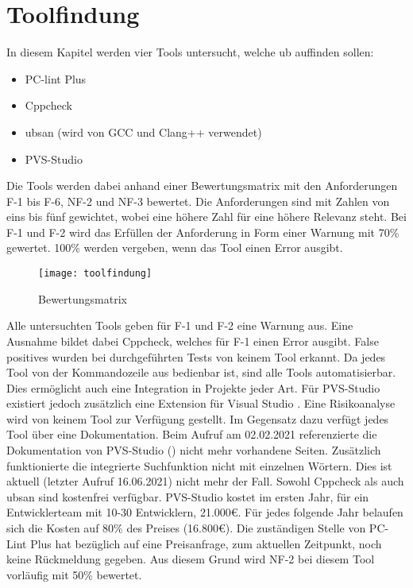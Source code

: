 \chapter{Toolfindung}
\label{ch:toolfindung}

In diesem Kapitel werden vier Tools untersucht, welche \gls{ub} auffinden sollen:
\begin{itemize}
    \item PC-lint Plus \cite{misc:pclintplus}
    \item Cppcheck \cite{misc:cppcheck}
    \item \gls{ubsan} (wird von GCC und Clang++ verwendet) \cite{misc:ubsan}
    \item PVS-Studio \cite{misc:pvsstudio}
\end{itemize}
Die Tools werden dabei anhand einer Bewertungsmatrix mit den Anforderungen F-1 bis F-6, NF-2 und NF-3 bewertet. Die Anforderungen sind mit Zahlen von eins bis fünf gewichtet, wobei 
eine höhere Zahl für eine höhere Relevanz steht. Bei F-1 und F-2 wird das Erfüllen der Anforderung in Form einer Warnung mit 70\% gewertet. 100\% werden vergeben, wenn das Tool einen 
Error ausgibt.
\begin{figure}[htpb]
    \centering
    \texttt{[image: toolfindung]}
    \caption{Bewertungsmatrix}
    \label{img:toolfindung}
\end{figure}

Alle untersuchten Tools geben für F-1 und F-2 eine Warnung aus. Eine Ausnahme bildet dabei Cppcheck, welches für F-1 einen Error ausgibt. \newline
False positives wurden bei durchgeführten Tests von keinem Tool erkannt.
Da jedes Tool von der Kommandozeile aus bedienbar ist, sind alle Tools automatisierbar. Dies ermöglicht auch eine Integration in Projekte jeder Art. Für PVS-Studio existiert jedoch 
zusätzlich eine Extension für Visual Studio \cite{misc:pvsplugin}. \newline
Eine Risikoanalyse wird von keinem Tool zur Verfügung gestellt. \newline
Im Gegensatz dazu verfügt jedes Tool über eine Dokumentation. Beim Aufruf am 02.02.2021 referenzierte die Dokumentation von PVS-Studio (\cite{misc:pvsdoku}) nicht mehr vorhandene Seiten. Zusätzlich 
funktionierte die integrierte Suchfunktion nicht mit einzelnen Wörtern. Dies ist aktuell (letzter Aufruf 16.06.2021) nicht mehr der Fall.\newline
Sowohl Cppcheck als auch \gls{ubsan} sind kostenfrei verfügbar. \newline 
PVS-Studio kostet im ersten Jahr, für ein Entwicklerteam mit 10-30 Entwicklern, 21.000€. Für jedes folgende Jahr belaufen sich die Kosten auf 80\% des Preises (16.800€).\newline 
Die zuständigen Stelle von PC-Lint Plus hat bezüglich auf eine Preisanfrage, zum aktuellen Zeitpunkt, noch keine Rückmeldung gegeben. Aus diesem Grund wird NF-2 bei diesem Tool 
vorläufig mit 50\% bewertet.

